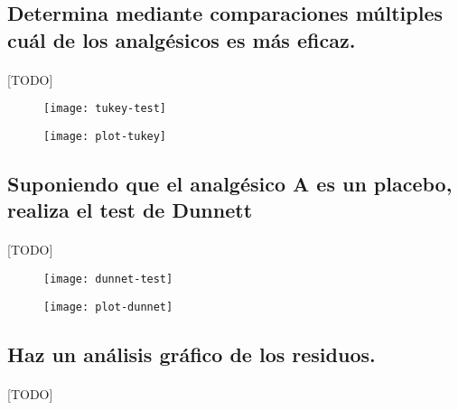 \documentclass[11pt]{article}
\begin{document}
    \subsection{Determina mediante comparaciones múltiples cuál de los analgésicos es más eficaz.}

      \paragraph{}
      [TODO]

      \begin{figure}[H]
        \centering
        \texttt{[image: tukey-test]}
        \caption{}
        \label{}
      \end{figure}

      \begin{figure}[H]
        \centering
        \texttt{[image: plot-tukey]}
        \caption{}
        \label{}
      \end{figure}

    \subsection{Suponiendo que el analgésico A es un placebo, realiza el test de Dunnett}

      \paragraph{}
      [TODO]


      \begin{figure}[H]
        \centering
        \texttt{[image: dunnet-test]}
        \caption{}
        \label{}
      \end{figure}

      \begin{figure}[H]
        \centering
        \texttt{[image: plot-dunnet]}
        \caption{}
        \label{}
      \end{figure}


    \subsection{Haz un análisis gráfico de los residuos.}

      \paragraph{}
      [TODO]
\end{document}
